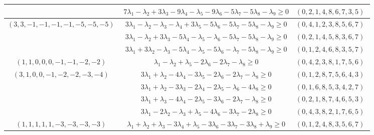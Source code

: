 \documentclass[12pt]{article}
\begin{document}
\begin{longtable}[l]{|c|c|c|}
 \cline{2-3} 
 & $7\lambda_{1}-\lambda_{2} + 3\lambda_{3}-9\lambda_{4}-\lambda_{5}-9\lambda_{6}-5\lambda_{7}-5\lambda_{8}-\lambda_{9}\geq 0$ & $(0 ,2 ,1 ,4 ,8 ,6 ,7 ,3 ,5) \;$\\ \hline\multirow{3}{*}{ $(3 ,3 ,-1 ,-1 ,-1 ,-1 ,-5 ,-5 ,-5) \;$ }  & $3\lambda_{1}-\lambda_{2}-\lambda_{3}-\lambda_{4} + 3\lambda_{5}-5\lambda_{6}-5\lambda_{7}-5\lambda_{8}-\lambda_{9}\geq 0$ & $(0 ,4 ,1 ,2 ,3 ,8 ,5 ,6 ,7) \;$\\ 
 \cline{2-3} 
 & $3\lambda_{1}-\lambda_{2} + 3\lambda_{3}-5\lambda_{4}-\lambda_{5}-\lambda_{6}-5\lambda_{7}-5\lambda_{8}-\lambda_{9}\geq 0$ & $(0 ,2 ,1 ,4 ,5 ,8 ,3 ,6 ,7) \;$\\ 
 \cline{2-3} 
 & $3\lambda_{1} + 3\lambda_{2}-\lambda_{3}-5\lambda_{4}-\lambda_{5}-5\lambda_{6}-\lambda_{7}-5\lambda_{8}-\lambda_{9}\geq 0$ & $(0 ,1 ,2 ,4 ,6 ,8 ,3 ,5 ,7) \;$\\ \hline\multirow{1}{*}{ $(1 ,1 ,0 ,0 ,0 ,-1 ,-1 ,-2 ,-2) \;$ }  & $\lambda_{1}-\lambda_{2} + \lambda_{5}-2\lambda_{6}-2\lambda_{7}-\lambda_{8}\geq 0$ & $(0 ,4 ,2 ,3 ,8 ,1 ,7 ,5 ,6) \;$\\ \hline\multirow{4}{*}{ $(3 ,1 ,0 ,0 ,-1 ,-2 ,-2 ,-3 ,-4) \;$ }  & $3\lambda_{1} + \lambda_{2}-4\lambda_{4}-3\lambda_{5}-2\lambda_{6}-2\lambda_{7}-\lambda_{8}\geq 0$ & $(0 ,1 ,2 ,8 ,7 ,5 ,6 ,4 ,3) \;$\\ 
 \cline{2-3} 
 & $3\lambda_{1} + \lambda_{2}-3\lambda_{3}-2\lambda_{4}-2\lambda_{5}-\lambda_{6}-4\lambda_{8}\geq 0$ & $(0 ,1 ,6 ,8 ,5 ,3 ,4 ,2 ,7) \;$\\ 
 \cline{2-3} 
 & $3\lambda_{1} + \lambda_{3}-4\lambda_{4}-2\lambda_{5}-3\lambda_{6}-2\lambda_{7}-\lambda_{8}\geq 0$ & $(0 ,2 ,1 ,8 ,7 ,4 ,6 ,5 ,3) \;$\\ 
 \cline{2-3} 
 & $3\lambda_{1}-2\lambda_{2}-\lambda_{3} + \lambda_{5}-4\lambda_{6}-3\lambda_{7}-2\lambda_{8}\geq 0$ & $(0 ,4 ,3 ,8 ,2 ,1 ,7 ,6 ,5) \;$\\ \hline\multirow{1}{*}{ $(1 ,1 ,1 ,1 ,1 ,-3 ,-3 ,-3 ,-3) \;$ }  & $\lambda_{1} + \lambda_{2} + \lambda_{3}-3\lambda_{4} + \lambda_{5}-3\lambda_{6}-3\lambda_{7}-3\lambda_{8} + \lambda_{9}\geq 0$ & $(0 ,1 ,2 ,4 ,8 ,3 ,5 ,6 ,7) \;$\\ \hline
  
 \end{longtable} 
 
\end{document}
